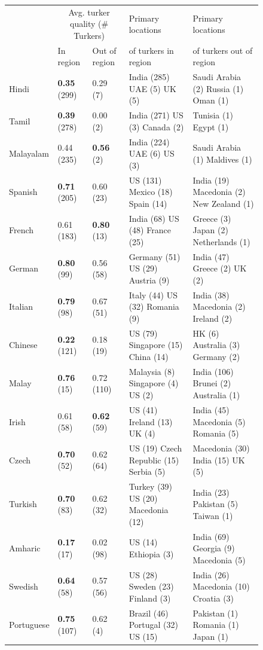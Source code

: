 \documentclass[11pt]{article}
\begin{document}
\begin{figure}[h]
\footnotesize
\begin{tabular}{lllll}
\hline\hline
&\multicolumn{2}{c}{Avg. turker quality (\# Turkers)}&Primary locations&Primary locations\\
&In region&Out of region&of turkers in region&of turkers out of region\\
\hline\hline
Hindi&\textbf{0.35} (299)&0.29 (7)&India (285) UAE (5) UK (5) &Saudi Arabia (2) Russia (1) Oman (1) \\
Tamil&\textbf{0.39} (278)&0.00 (2)&India (271) US (3) Canada (2) &Tunisia (1) Egypt (1) \\
Malayalam&0.44 (235) &\textbf{0.56} (2)&India (224) UAE (6) US (3) &Saudi Arabia (1) Maldives (1) \\
Spanish&\textbf{0.71} (205)&0.60 (23)&US (131) Mexico (18) Spain (14) &India (19) Macedonia (2) New Zealand (1) \\
French&0.61 (183) &\textbf{0.80} (13)&India (68) US (48) France (25) &Greece (3) Japan (2) Netherlands (1) \\
German&\textbf{0.80} (99)&0.56 (58)&Germany (51) US (29) Austria (9) &India (47) Greece (2) UK (2) \\
Italian&\textbf{0.79} (98)&0.67 (51)&Italy (44) US (32) Romania (9) &India (38) Macedonia (2) Ireland (2) \\
Chinese&\textbf{0.22} (121)&0.18 (19)&US (79) Singapore (15) China (14) &HK (6) Australia (3) Germany (2) \\
Malay&\textbf{0.76} (15)&0.72 (110)&Malaysia (8) Singapore (4) US (2) &India (106) Brunei (2) Australia (1) \\
Irish&0.61 (58) &\textbf{0.62} (59)&US (41) Ireland (13) UK (4) &India (45) Macedonia (5) Romania (5) \\
Czech&\textbf{0.70} (52)&0.62 (64)&US (19) Czech Republic (15) Serbia (5) &Macedonia (30) India (15) UK (5) \\
Turkish&\textbf{0.70} (83)&0.62 (32)&Turkey (39) US (20) Macedonia (12) &India (23) Pakistan (5) Taiwan (1) \\
Amharic&\textbf{0.17} (17)&0.02 (98)&US (14) Ethiopia (3) &India (69) Georgia (9) Macedonia (5) \\
Swedish&\textbf{0.64} (58)&0.57 (56)&US (28) Sweden (23) Finland (3) &India (26) Macedonia (10) Croatia (3) \\
Portuguese&\textbf{0.75} (107)&0.62 (4)&Brazil (46) Portugal (32) US (15) &Pakistan (1) Romania (1) Japan (1) \\

\end{tabular}
\end{figure}
\end{document}
